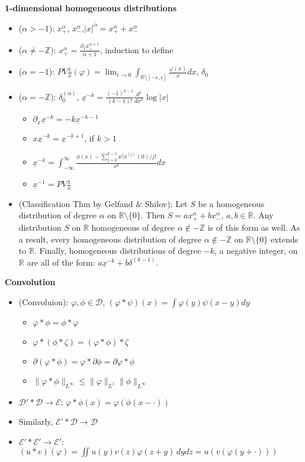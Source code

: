 \documentclass[a4paper, 11pt]{article}
\theoremstyle{definition}
\theoremstyle{remark}
\newcommand{\cD}{\mathcal{D}}
\newcommand{\cE}{\mathcal{E}}
\newcommand{\RR}{\mathbb{R}}
\newcommand{\ZZ}{\mathbb{Z}}
\begin{document}
\textbf{1-dimensional homogeneous distributions}
\begin{itemize}
    \item ($\alpha>-1$): $x_+^\alpha$, $x_-^\alpha$,$|x|^\alpha = x_+^\alpha+ x_-^\alpha$
    \item ($\alpha \neq -\ZZ$): $x_+^\alpha = \frac{\partial_x x_+^{\alpha+1}}{\alpha+1}$, induction to define
    \item ($\alpha = -1$): $PV \frac{1}{x}(\varphi) = \lim_{\epsilon \to 0} \int_{\RR\setminus [-\epsilon, \epsilon]} \frac{\varphi(x)}{x}dx$, $\delta_0$
    \item ($\alpha = -\ZZ$): $\delta_0^{(\alpha)}$, $\underline{x}^{-k}=\frac{(-1)^{k-1}}{(k-1) !} \frac{d^{k}}{d x^{k}} \log |x|$
    \begin{itemize}
        \item $\partial_x \underline x^{-k} = -k \underline x ^{-k-1}$
        \item $ x\underline x^{-k} = \underline x ^{-k+1}$, if $k>1$
        \item $\underline{x}^{-k}=\int_{-\infty}^{\infty} \frac{\phi(x)-\sum_{j=0}^{k-1} x^{j} \phi^{(j)}(0) / j !}{x^{k}} d x$
        \item $\underline x^{-1} = PV \frac 1 x $
    \end{itemize}
    \item (Classification Thm by Gelfand \& Shilov): Let $S$ be a homogeneous distribution of degree $\alpha$ on $\RR\setminus \{0\}$. Then $S= ax_+^\alpha + bx_-^\alpha$, $a,b \in \RR$. Any distribution $S$ on $\RR$ homogeneous of degree $\alpha \notin -\ZZ$ is of this form as well. As a result, every homogeneous distribution of degree $\alpha \notin - \ZZ$ on $\RR\setminus \{0\}$ extends to $\RR$. Finally, homogeneous distributions of degree $-k$, a negative integer, on $\RR$ are all of the form: $a\underline{x}^{-k} + b\delta^{(k-1)}$.
\end{itemize}

\textbf{Convolution}
\begin{itemize}
    \item (Convoluion): $\varphi, \phi\in \cD$, $(\varphi * \psi)(x)=\int \varphi(y) \psi(x-y) d y$
    \begin{itemize}
        \item $\varphi * \phi = \phi * \varphi$
        \item $\varphi *(\phi *\zeta) = (\varphi * \phi)*\zeta$
        \item $\partial(\varphi* \phi) = \varphi * \partial \phi = \partial \varphi * \phi$
        \item $\|\varphi * \phi\|_{L^{\infty}} \le \| \varphi\|_{L^1}\|\phi\|_{L^{\infty}}$
    \end{itemize}
    \item $\cD' * \cD \to \cE$: $\varphi *\phi (x) = \varphi(\phi(x-\cdot))$
    \item Similarly, $\cE'*\cD \to \cD$
    \item $\cE' * \cE'\to \cE'$: $(u*v)(\varphi) = \iint u(y)v(z) \varphi(z+y) \,dydz= u(v(\varphi(y+\cdot)))$
\end{itemize}
\end{document}
